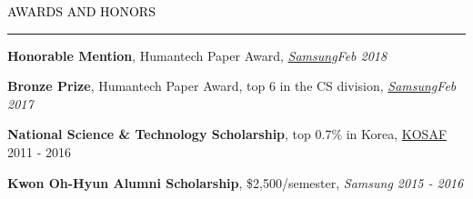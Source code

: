 \documentclass{resume} %
\renewenvironment{rSection}[1]{
	\sectionskip
	\textcolor{Black}{\MakeUppercase{#1}}
	\sectionlineskip
	\hrule
	\begin{list}{}{
			\setlength{\leftmargin}{1.5em}
		}
		\item[]
	}{
	\end{list}
}
\begin{document}

\begin{rSection}{Awards and Honors}
	\vspace*{-2.5mm}
	\begin{rSubsection}{}{}{}{}
		\item \textbf{Honorable Mention}, Humantech Paper Award, \em{\href{https://humantech.samsung.com/saitext/index.jsp}{Samsung}}\em \hfill Feb 2018
		
		\item \textbf{Bronze Prize}, Humantech Paper Award, top 6 in the CS division, \em{\href{https://humantech.samsung.com/saitext/index.jsp}{Samsung}}\em \hfill Feb 2017
		
		\item \textbf{National Science \& Technology Scholarship}, top 0.7\% in Korea, \href{http://www.kosaf.go.kr/}{KOSAF} \hfill 2011 - 2016
		
		\item \textbf{Kwon Oh-Hyun Alumni Scholarship}, \$2,500/semester, \em Samsung \em \hfill 2015 - 2016
		
	\end{rSubsection}

\end{rSection}

\end{document}
